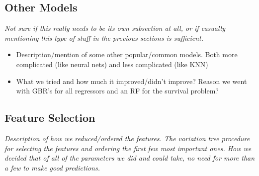 \documentclass[fleqn,usenatbib]{mnras}
\begin{document}
\subsection{Other Models}
\label{sec:other models} %

\textit{Not sure if this really needs to be its own subsection at all, or if casually mentioning this type of stuff in the previous sections is sufficient.}
\begin{itemize}
	\item Description/mention of some other popular/common models. Both more complicated (like neural nets) and less complicated (like KNN)
    \item What we tried and how much it improved/didn't improve? Reason we went with GBR's for all regressors and an RF for the survival problem?

\end{itemize}

\subsection{Feature Selection}
\label{sec:feature selection} %

\textit{Description of how we reduced/ordered the features. The variation tree procedure for selecting the features and ordering the first few most important ones. How we decided that of all of the parameters we did and could take, no need for more than a few to make good predictions.}
\end{document}
